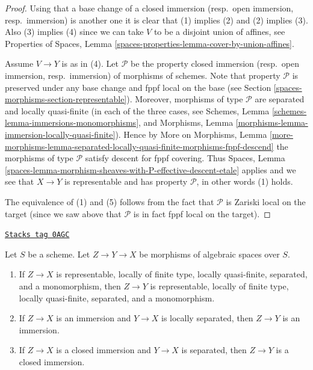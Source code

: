 \begin{proof}
Using that a base change of a
closed immersion (resp.\ open immersion, resp.\ immersion)
is another one it is clear that (1) implies (2) and (2) implies (3).
Also (3) implies (4) since we can take $V$ to be a disjoint union of
affines, see
Properties of Spaces,
Lemma \ref{spaces-properties-lemma-cover-by-union-affines}.

\medskip\noindent
Assume $V \to Y$ is as in (4).
Let $\mathcal{P}$ be the property
closed immersion (resp.\ open immersion, resp.\ immersion)
of morphisms of schemes. Note that property $\mathcal{P}$
is preserved under any base change and fppf local on the
base (see Section \ref{spaces-morphisms-section-representable}).
Moreover, morphisms of type $\mathcal{P}$ are separated and
locally quasi-finite (in each of the three cases, see
Schemes, Lemma \ref{schemes-lemma-immersions-monomorphisms}, and
Morphisms, Lemma \ref{morphisms-lemma-immersion-locally-quasi-finite}).
Hence by
More on Morphisms, Lemma
\ref{more-morphisms-lemma-separated-locally-quasi-finite-morphisms-fppf-descend}
the morphisms of type $\mathcal{P}$ satisfy descent for fppf covering. Thus
Spaces, Lemma \ref{spaces-lemma-morphism-sheaves-with-P-effective-descent-etale}
applies and we see that $X \to Y$ is representable and has property
$\mathcal{P}$, in other words (1) holds.

\medskip\noindent
The equivalence of (1) and (5) follows from the fact that
$\mathcal{P}$ is Zariski local on the target (since we saw
above that $\mathcal{P}$ is in fact fppf local on the target).
\end{proof}

\begin{lemma}
\label{spaces-morphisms-lemma-immersion-permanence}
\href{https://stacks.math.columbia.edu/tag/0AGC}{\texttt{Stacks tag 0AGC}}

Let $S$ be a scheme.
Let $Z \to Y \to X$ be morphisms of algebraic spaces over $S$.
\begin{enumerate}
\item If $Z \to X$ is representable, locally of finite type, locally
quasi-finite, separated, and a monomorphism, then $Z \to Y$ is
representable, locally of finite type, locally quasi-finite,
separated, and a monomorphism.
\item If $Z \to X$ is an immersion and $Y \to X$ is locally separated,
then $Z \to Y$ is an immersion.
\item If $Z \to X$ is a closed immersion and $Y \to X$ is separated,
then $Z \to Y$ is a closed immersion.
\end{enumerate}
\end{lemma}

